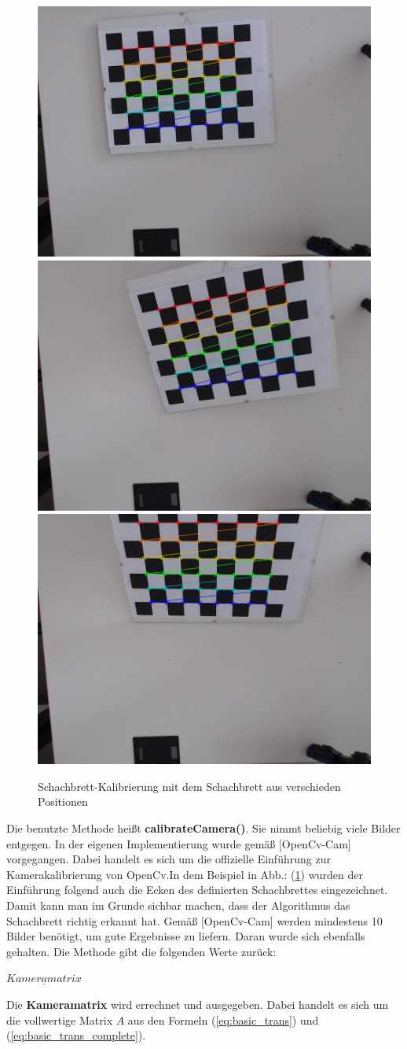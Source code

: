 		\begin{figure}[h]
			\centering
			\includegraphics[width=0.32\linewidth]{img/hauptteil/calibration/chessboard_corner_0.png}
			\includegraphics[width=0.32\linewidth]{img/hauptteil/calibration/chessboard_corner_1.png}
			\includegraphics[width=0.32\linewidth]{img/hauptteil/calibration/chessboard_corner_2.png}
			\caption[Schachbrett-Kalibrierung]{Schachbrett-Kalibrierung mit dem Schachbrett aus verschieden Positionen}
			\label{fig:chessboards}
		\end{figure}
	
		Die benutzte Methode heißt \textbf{calibrateCamera()}. Sie nimmt beliebig viele Bilder entgegen. In der eigenen Implementierung wurde gemäß [OpenCv-Cam] vorgegangen. Dabei handelt es sich um die offizielle Einführung zur Kamerakalibrierung von OpenCv.In dem Beispiel in Abb.: (\ref{fig:chessboards}) wurden der Einführung folgend auch die Ecken des definierten Schachbrettes eingezeichnet. Damit kann man im Grunde sichbar machen, dass der Algorithmus das Schachbrett richtig erkannt hat. Gemäß [OpenCv-Cam] werden mindestens 10 Bilder benötigt, um gute Ergebnisse zu liefern. Daran wurde sich ebenfalls gehalten. Die Methode gibt die folgenden Werte zurück:
		
		$\underline{Kameramatrix}$
		
		Die \textbf{Kameramatrix} wird errechnet und ausgegeben. Dabei handelt es sich um die vollwertige Matrix \( A \) aus den Formeln (\ref{eq:basic_trans}) und (\ref{eq:basic_trans_complete}).
		
